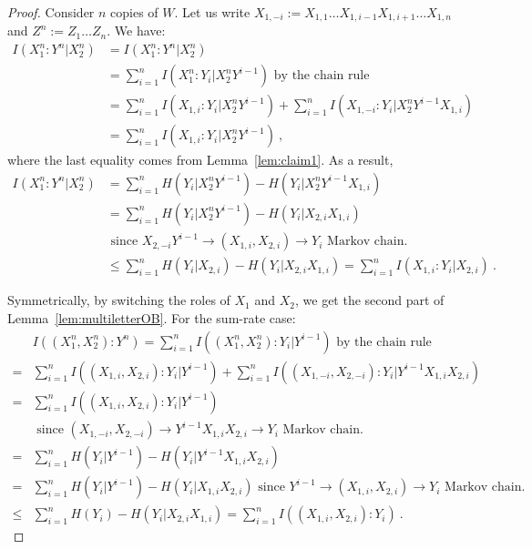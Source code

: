   \begin{proof}
    Consider $n$ copies of $W$. Let us write $X_{1,-i} := X_{1,1} \ldots X_{1,i-1} X_{1,i+1} \ldots X_{1,n}$ and $Z^n := Z_1 \ldots Z_n$. We have:
    \begin{equation}
      \begin{aligned}
        I(X_1^n:Y^n|X_2^n) &= I(X_1^n:Y^n|X_2^n)\\
        &= \sum_{i=1}^n I(X_1^n:Y_i|X_2^nY^{i-1}) \text{ by the chain rule}\\
        &= \sum_{i=1}^n I(X_{1,i}:Y_i|X_2^nY^{i-1}) + \sum_{i=1}^n I(X_{1,-i}:Y_i|X_2^nY^{i-1}X_{1,i})\\
        &= \sum_{i=1}^n I(X_{1,i}:Y_i|X_2^nY^{i-1}) \ ,
        \end{aligned}
     \end{equation}
     where the last equality comes from Lemma~\ref{lem:claim1}. As a result,
     \begin{equation}
     \begin{aligned}
        I(X_1^n:Y^n|X_2^n) &= \sum_{i=1}^n H(Y_i|X_2^nY^{i-1}) - H(Y_i|X_2^nY^{i-1}X_{1,i})\\
        &= \sum_{i=1}^n H(Y_i|X_2^nY^{i-1}) - H(Y_i|X_{2,i}X_{1,i})\\
        &\text{ since $X_{2,-i} Y^{i-1} \rightarrow (X_{1,i},X_{2,i}) \rightarrow Y_i$ Markov chain.}\\
        &\leq \sum_{i=1}^n H(Y_i|X_{2,i}) - H(Y_i|X_{2,i}X_{1,i}) = \sum_{i=1}^n I(X_{1,i}:Y_i|X_{2,i}) \ .
      \end{aligned}
    \end{equation}
    
      Symmetrically, by switching the roles of $X_1$ and $X_2$, we get the second part of Lemma~\ref{lem:multiletterOB}. For the sum-rate case:
      \begin{equation*}
        \begin{aligned}
          &I((X_1^n,X_2^n):Y^n) = \sum_{i=1}^n I((X_1^n,X_2^n):Y_i|Y^{i-1}) \text{ by the chain rule}\\
          = &\sum_{i=1}^n I((X_{1,i},X_{2,i}):Y_i|Y^{i-1}) + \sum_{i=1}^n I((X_{1,-i},X_{2,-i}):Y_i|Y^{i-1}X_{1,i}X_{2,i})\\
          = &\sum_{i=1}^n I((X_{1,i},X_{2,i}):Y_i|Y^{i-1})\\
          &\text{ since $(X_{1,-i},X_{2,-i}) \rightarrow Y^{i-1}X_{1,i}X_{2,i} \rightarrow Y_i$ Markov chain.}\\
          = &\sum_{i=1}^n H(Y_i|Y^{i-1}) - H(Y_i|Y^{i-1}X_{1,i}X_{2,i})\\
          = &\sum_{i=1}^n H(Y_i|Y^{i-1}) - H(Y_i|X_{1,i}X_{2,i}) \text{ since $Y^{i-1} \rightarrow (X_{1,i},X_{2,i}) \rightarrow Y_i$ Markov chain.}\\
          \leq &\sum_{i=1}^n H(Y_i) - H(Y_i|X_{2,i}X_{1,i}) = \sum_{i=1}^n I((X_{1,i},X_{2,i}):Y_i) \ .
        \end{aligned}
      \end{equation*}
  \end{proof}
  
